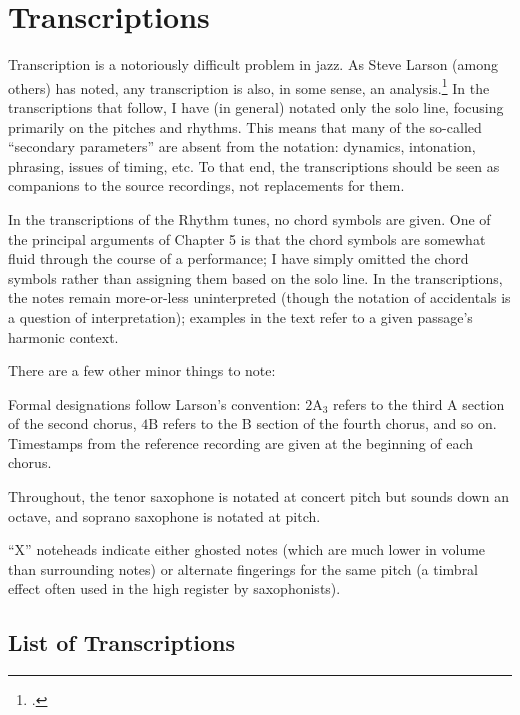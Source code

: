 \doublespacing
\chapter{Transcriptions}
\addtocspace
\singlespacing

Transcription is a notoriously difficult problem in jazz. As Steve Larson
(among others) has noted, any transcription is also, in some sense, an
analysis.\footcite[2]{larson:2009} In the transcriptions that follow, I have
(in general) notated only the solo line, focusing primarily on the pitches and
rhythms. This means that many of the so-called ``secondary parameters'' are
absent from the notation: dynamics, intonation, phrasing, issues of timing,
etc. To that end, the transcriptions should be seen as companions to the
source recordings, not replacements for them.

In the transcriptions of the Rhythm tunes, no chord symbols are given.
One of the principal arguments of Chapter 5 is that the chord symbols are
somewhat fluid through the course of a performance; I have simply omitted the
chord symbols rather than assigning them based on the solo line. In the
transcriptions, the notes remain more-or-less uninterpreted (though the
notation of accidentals is a question of interpretation); examples in the text
refer to a given passage's harmonic context.

\vspace{\baselineskip}
\noindent There are a few other minor things to note:
\begin{compactitem}
  \item Formal designations follow Larson's convention: $2\mathrm{A}_3$ refers
    to the third A section of the second chorus, $4\mathrm{B}$ refers to the B
    section of the fourth chorus, and so on. Timestamps from the reference
    recording are given at the beginning of each chorus.
  \item Throughout, the tenor saxophone is notated at concert pitch but sounds
    down an octave, and soprano saxophone is notated at pitch.
  \item ``X'' noteheads indicate either ghosted notes (which are much lower in
    volume than surrounding notes) or alternate fingerings for the same pitch
    (a timbral effect often used in the high register by saxophonists).
\end{compactitem}

\section*{List of Transcriptions}

